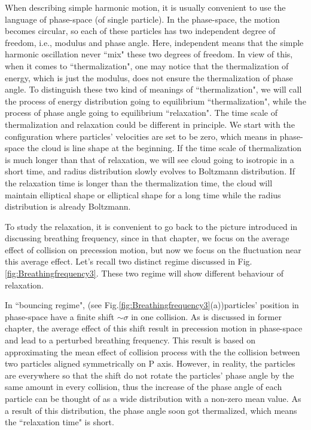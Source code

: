 \documentclass[aps,pre,twocolumn,groupedaddress]{revtex4-1}
\begin{document}
When describing simple harmonic motion, it is usually convenient to use the language of phase-space (of single particle). In the phase-space, the motion becomes circular, so each of these particles has two independent degree of freedom, i.e., modulus and phase angle. Here, independent means that the simple harmonic oscillation never ``mix" these two degrees of freedom. In view of this, when it comes to ``thermalization", one may notice that the thermalization of energy, which is just the modulus, does not ensure the thermalization of phase angle. To distinguish these two kind of meanings of ``thermalization", we will call the process of energy distribution going to equilibrium ``thermalization", while the process of phase angle going to equilibrium ``relaxation". The time scale of thermalization and relaxation could be different in principle. We start with the configuration where particles' velocities are set to be zero, which means in phase-space the cloud is line shape at the beginning. If the time scale of thermalization is much longer than that of relaxation, we will see cloud going to isotropic in a short time, and radius distribution slowly evolves to Boltzmann distribution. If the relaxation time is longer than the thermalization time, the cloud will maintain elliptical shape or elliptical shape for a long time while the radius distribution is already Boltzmann.

To study the relaxation, it is convenient to go back to the picture introduced in discussing breathing frequency, since in that chapter, we focus on the average effect of collision on precession motion, but now we focus on the fluctuation near this average effect. Let's recall two distinct regime discussed in Fig.\ref{fig:Breathingfrequency3}. These two regime will show different behaviour of relaxation.

In ``bouncing regime", (see Fig.\ref{fig:Breathingfrequency3}(a))particles' position in phase-space have a finite shift $\sim\sigma$ in one collision. As is discussed in former chapter, the average effect of this shift result in precession motion in phase-space and lead to a perturbed breathing frequency. This result is based on approximating the mean effect of collision process with the the collision between two particles aligned symmetrically on P axis. However, in reality, the particles 
are everywhere so that the shift do not rotate the particles' phase angle by the same amount in every collision, thus the increase of the phase angle of each particle can be thought of as a wide distribution with a non-zero mean value. As a result of this distribution, the phase angle soon got thermalized, which means the ``relaxation time" is short.
\end{document}

